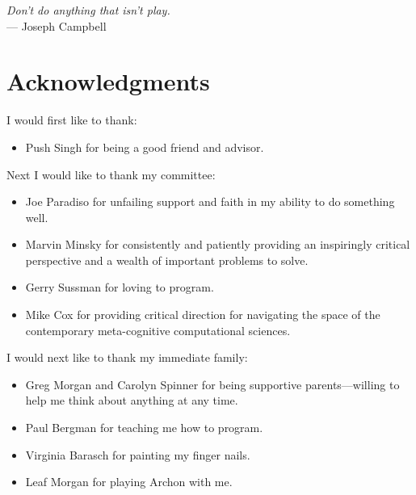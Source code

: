 



\begin{flushright}{\slshape    
Don't do anything that isn't play.} \\ \medskip
    --- Joseph Campbell
\end{flushright}



\bigskip

\begingroup
\let\clearpage\relax
\let\cleardoublepage\relax
\let\cleardoublepage\relax
\chapter*{Acknowledgments}

I would first like to thank:

\begin{itemize}
\item{Push Singh for being a good friend and advisor.}
\end{itemize}

Next I would like to thank my committee:

\begin{itemize}
\item{Joe Paradiso for unfailing support and faith in my ability to do
  something well.}
\item{Marvin Minsky for consistently and patiently providing an
  inspiringly critical perspective and a wealth of important problems
  to solve.}
\item{Gerry Sussman for loving to program.}
\item{Mike Cox for providing critical direction for navigating the
  space of the contemporary meta-cognitive computational sciences.}
\end{itemize}

I would next like to thank my immediate family:

\begin{itemize}
\item{Greg Morgan and Carolyn Spinner for being supportive parents---willing to help me think about anything at any time.}
\item{Paul Bergman for teaching me how to program.}
\item{Virginia Barasch for painting my finger nails.}
\item{Leaf Morgan for playing Archon with me.}
\end{itemize}

